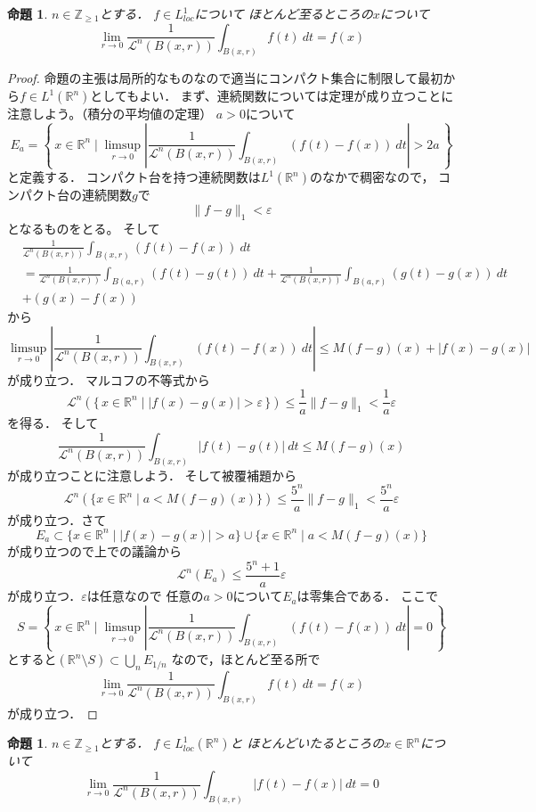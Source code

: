 \documentclass[leqno, a4paper, 12pt]{jsarticle}
\newtheorem{prop}[thm]{命題}
\newcommand{\zz}{\mathbb{Z}}
\newcommand{\rr}{\mathbb{R}}
\newcommand{\ep}{\varepsilon}
\begin{document}
\begin{prop}\label{prop:hyouka}
$n\in \zz_{\ge 1}$とする．
$f\in L_{loc}^1$について
ほとんど至るところの$x$について
\[
\lim_{r\to 0}\frac{1}{\mathcal{L}^{n}(B(x,r))}\int_{B(x,r)} f(t)\ dt=f(x)
\]
\end{prop}

\begin{proof}
命題の主張は局所的なものなので適当にコンパクト集合に制限して最初から$f\in L^{1}(\rr^{n})$としてもよい．
まず、連続関数については定理が成り立つことに注意しよう。（積分の平均値の定理）
$a>0$について
\[
E_a=\left\{\, 
x\in \rr^n\mid \limsup_{r\to 0}\left|\frac{1}{\mathcal{L}^{n}(B(x,r))}\int_{B(x,r)}(f(t)-f(x))\ dt\right|>2a
\, \right\}
\]
と定義する．
コンパクト台を持つ連続関数は$L^{1}(\rr^{n})$のなかで稠密なので，
コンパクト台の連続関数$g$で
\[
\|f-g\|_1<\ep
\]
となるものをとる。
そして
\begin{align*}
&\frac{1}{\mathcal{L}^{n}(B(x,r))}\int_{B(x,r)}(f(t)-f(x))\ dt\\
&=
\frac{1}{\mathcal{L}^{n}(B(x,r))}\int_{B(a,r)}(f(t)-g(t))\ dt+
\frac{1}{\mathcal{L}^{n}(B(x,r))}\int_{B(a,r)}(g(t)-g(x))\ dt 
\\
&+(g(x)-f(x))
\end{align*}
から
\[
\limsup_{r\to 0}\left|\frac{1}{\mathcal{L}^{n}(B(x,r))}\int_{B(x,r)}(f(t)-f(x))\ dt\right|\le 
M(f-g)(x)+|f(x)-g(x)|
\]
が成り立つ．
マルコフの不等式から
\[
\mathcal{L}^{n}(\{\, 
x\in \rr^n\mid |f(x)-g(x)|>\ep\,  \})
\le \frac{1}{a}\|f-g\|_1<\frac{1}{a}\ep
\]
を得る．
そして
\[
\frac{1}{\mathcal{L}^{n}(B(x,r))}\int_{B(x,r)}|f(t)-g(t)|\ dt\le M(f-g)(x)
\]
が成り立つことに注意しよう．
そして被覆補題から
\[
\mathcal{L}^{n}(\{x\in \rr^n\mid a<M(f-g)(x)\})\le \frac{5^n}{a}\|f-g\|_1<\frac{5^n}{a}\ep
\]
が成り立つ．さて
\[
E_a\subset \{x\in \rr^n\mid |f(x)-g(x)|>a\}\cup \{x\in \rr^n\mid a<M(f-g)(x)\}
\]
が成り立つので上での議論から
\[
\mathcal{L}^{n}(E_a)\le \frac{5^n+1}{a}\ep
\]
が成り立つ．$\ep$は任意なので
任意の$a>0$について$E_a$は零集合である．
ここで
\[
S=\left\{\, 
x\in \rr^n\mid \limsup_{r\to 0}\left|\frac{1}{\mathcal{L}^{n}(B(x,r))}\int_{B(x,r)}(f(t)-f(x))\ dt\right|=0\, 
\right\}
\]
とすると$(\rr^n\setminus S)\subset \bigcup_{n}E_{1/n}$
なので，ほとんど至る所で
\[
\lim_{r\to 0}\frac{1}{\mathcal{L}^{n}(B(x,r))}\int_{B(x,r)} f(t)\ dt=f(x)
\]
が成り立つ．
\end{proof}


\begin{prop}
$n\in \zz_{\ge 1}$とする．
$f\in L_{loc}^1(\rr^{n})$と
ほとんどいたるところの$x\in \rr^n$について
\[
\lim_{r\to 0}\frac{1}{\mathcal{L}^{n}(B(x,r))}\int_{B(x,r)}|f(t)-f(x)|\ dt=0
\]
\end{prop}
\end{document}
